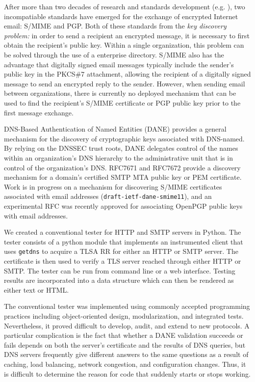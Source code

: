 \documentclass[preprint,5p]{elsarticle}
\begin{document}
After more than two decades of research and standards development
(e.g. \cite{rfc1421,rfc4880,rfc5750}), two incompatiable standards
have emerged for the exchange of encrypted Internet email: S/MIME and
PGP. Both of these standards from the \emph{key discovery problem:} in
order to send a recipient an encrypted message, it is necessary to
first obtain the recipient's public key. Within a single organization,
this problem can be solved through the use of a enterprise
directory. S/MIME also has the advantage that digitally signed email
messages typically include the sender's public key in the PKCS\#7
attachment\cite{rfc2315}, allowing the recipient of a digitally signed
message to send an encrypted reply to the sender. However, when
sending email between organizations, there is currently no deployed
mechanism that can be used to find the recipient's S/MIME certificate
or PGP public key prior to the first message exchange.

DNS-Based Authentication of Named
Entities\cite{rfc7671} (DANE) provides a general mechanism for the
discovery of cryptographic keys associated with DNS-named. By relying
on the DNSSEC\cite{rfc3833} trust roots, DANE delegates control of the
names within an organization's DNS hierarchy to the administrative
unit that is in control of the organization's DNS. RFC7671 and RFC7672 provide a
discovery mechanism for a domain's certified SMTP MTA public key or
PEM certificate\cite{rfc7671,rfc7672}. Work is in progress on a mechanism for discovering
S/MIME certificates associated with email addresses
(\texttt{draft-ietf-dane-smime11}), and 
an experimental RFC was recently approved for associating OpenPGP public keys with email addresses\cite{rfc7929}.

We created a conventional tester for HTTP and SMTP servers in
Python. The tester consists of a python module that implements an
instrumented client that uses \texttt{getdns}\cite{getdns} to acquire a TLSA RR for either
an HTTP or SMTP server. The certificate is then used to verify a TLS
server reached through either HTTP or SMTP. The tester can be run from
command line or a web interface. Testing results are incorporated into
a data structure which can then be rendered as either text or HTML.

The conventional tester was implemented using commonly accepted
programming practices including object-oriented design,
modularization, and integrated tests. Nevertheless, it proved
difficult to develop, audit, and extend to new protocols. A particular
complication is the fact that whether a DANE validation succeeds or
fails depends on both the server's certificate and the results of DNS
queries, but DNS servers frequently give different answers to the same
questions as a result of caching, load balancing, network congestion,
and configuration changes. Thus, it is difficult to determine the
reason for code that suddenly starts or stops working.
\end{document}
